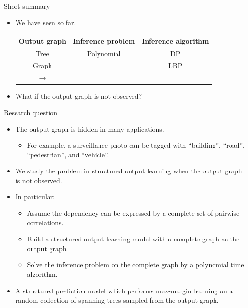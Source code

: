 \documentclass[first=dgreen,second=purple,logo=yellowexc]{aaltoslides}
\begin{document}
%
\begin{frame}{Short summary}
	\begin{itemize}\footnotesize
		\item We have seen so far. 
		\begin{tabular}{|c|c|c|}
			\hline
			\footnotesize
			 Output graph & Inference problem & Inference algorithm \\ \hline
			 Tree & Polynomial & DP \cite{Rousu07}  \\
			 Graph & \nphard & LBP \cite{su10structured}  \\ 
			 $\rightarrow$ \daggraph & \nphard & \sdp\ \cite{su14structured} \\ \hline
		\end{tabular}
		\item What if the output graph is not observed?
	\end{itemize}
\end{frame}
%
\begin{frame}{Research question}
	\begin{itemize}\footnotesize
		\item The output graph is hidden in many applications.
		\begin{itemize}\footnotesize
			\item For example, a surveillance photo can be tagged with ``building'', ``road'', ``pedestrian'', and ``vehicle''.
		\end{itemize}
		\item We study the problem in structured output learning when the output graph is not observed.
		\item In particular:
		\begin{itemize}\footnotesize
			\item Assume the dependency can be expressed by a complete set of pairwise correlations.
			\item Build a structured output learning model with a complete graph as the output graph.
			\item Solve the \nphard inference problem on the complete graph by a polynomial time algorithm.
		\end{itemize}
		\item A structured prediction model which performs max-margin learning on a random collection of spanning trees sampled from the output graph.
	\end{itemize}
\end{frame}
\end{document}
